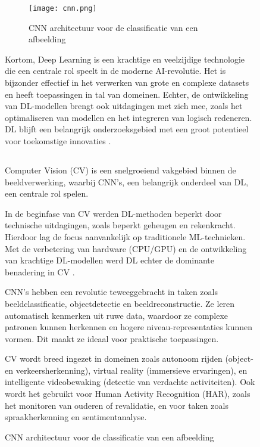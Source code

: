 \begin{figure}[h]
\begin{figure}
  \centering
  \texttt{[image: cnn.png]}
  \caption[Figuur 2]{\label{fig:cnn}CNN architectuur voor de classificatie van een afbeelding \autocite{ChaiEtAl2021}}
\end{figure}



Kortom, Deep Learning is een krachtige en veelzijdige technologie die een centrale rol speelt in de moderne AI-revolutie. 
Het is bijzonder effectief in het verwerken van grote en complexe datasets en heeft toepassingen in tal van domeinen. 
Echter, de ontwikkeling van DL-modellen brengt ook uitdagingen met zich mee, zoals het optimaliseren van modellen en het integreren van logisch redeneren. 
DL blijft een belangrijk onderzoeksgebied met een groot potentieel voor toekomstige innovaties \autocite{JiangEtAl2022}.

\subsection{}%
\label{subsec:computer-vision}

Computer Vision (CV) is een snelgroeiend vakgebied binnen de beeldverwerking, waarbij CNN's, een belangrijk onderdeel van DL, een centrale rol spelen.  

\medskip

In de beginfase van CV werden DL-methoden beperkt door technische uitdagingen, zoals beperkt geheugen en rekenkracht. 
Hierdoor lag de focus aanvankelijk op traditionele ML-technieken. 
Met de verbetering van hardware (CPU/GPU) en de ontwikkeling van krachtige DL-modellen werd DL echter de dominante benadering in CV \autocite{ChaiEtAl2021}.

\medskip

CNN's hebben een revolutie teweeggebracht in taken zoals beeldclassificatie, objectdetectie en beeldreconstructie. 
Ze leren automatisch kenmerken uit ruwe data, waardoor ze complexe patronen kunnen herkennen en hogere niveau-representaties kunnen vormen. 
Dit maakt ze ideaal voor praktische toepassingen. 

\medskip

CV wordt breed ingezet in domeinen zoals autonoom rijden (object- en verkeersherkenning), virtual reality (immersieve ervaringen), en intelligente videobewaking (detectie van verdachte activiteiten). 
Ook wordt het gebruikt voor Human Activity Recognition (HAR), zoals het monitoren van ouderen of revalidatie, en voor taken zoals spraakherkenning en sentimentanalyse. 


\end{figure}
